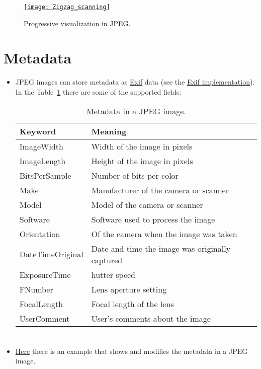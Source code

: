 \begin{figure}[H]
  \vspace{-2ex}
  \centering
  \href{https://es.m.wikipedia.org/wiki/Archivo:Zigzag_scanning.jpg}{\texttt{[image: Zigzag\_scanning]}}
  \caption{Progressive visualization in \gls{JPEG}.}
  \label{fig:JPEG_progressive}
\end{figure}

\section{Metadata}
\begin{itemize}
\item \gls{JPEG} images can store metadata as
  \href{https://en.wikipedia.org/wiki/Exif}{Exif} data (see the
  \href{https://gitlab.com/TNThieding/exif/-/blob/master/docs/api_reference.rst?ref_type=heads}{Exif
    implementation}). In the Table~\ref{tab:JPEG_metadata} there are
  some of the supported fields:
  \begin{table}[!h]
    \vspace{2ex}
    \begin{center}
      \begin{tabular}{l|l}
        Keyword & Meaning\\
        \hline
        ImageWidth & Width of the image in pixels \\
        ImageLength & Height of the image in pixels \\
        BitsPerSample&  Number of bits per color \\
        Make & Manufacturer of the camera or scanner \\
        Model & Model of the camera or scanner \\
        Software & Software used to process the image \\
        Orientation & Of the camera when the image was taken \\
        DateTimeOriginal & Date and time the image was originally captured \\
        ExposureTime & hutter speed \\
        FNumber & Lens aperture setting \\
        FocalLength & Focal length of the lens \\
        UserComment & User's comments about the image
      \end{tabular}
    \end{center}
    \caption{Metadata in a JPEG image.}
    \label{tab:JPEG_metadata}
  \end{table}
\end{itemize}

\section*{}
\begin{itemize}
\item
  \href{https://github.com/vicente-gonzalez-ruiz/medical_imaging/blob/main/notebooks/JPEG_add_metadata.ipynb}{Here}
  there is an example that shows and modifies the metadata in a JPEG
  image.
\end{itemize}
